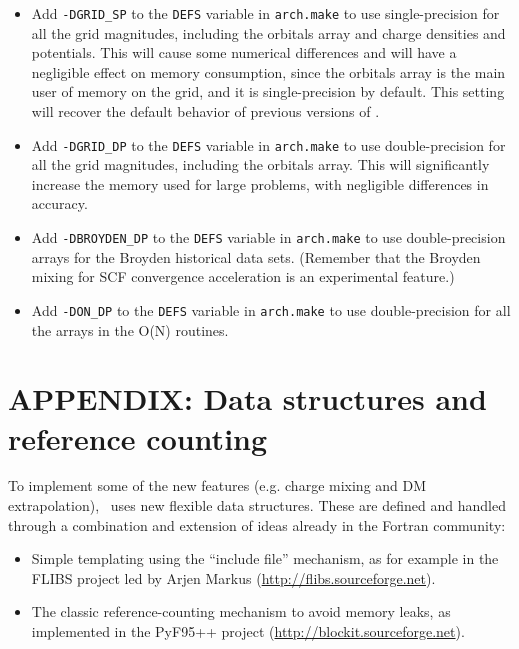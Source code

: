 \begin{itemize}

  \item Add \texttt{-DGRID\_SP} to the \texttt{DEFS} variable in
  \texttt{arch.make} to use single-precision for all the grid
  magnitudes, including the orbitals array and charge densities and
  potentials.  This will cause some numerical differences and will
  have a negligible effect on memory consumption, since the orbitals
  array is the main user of memory on the grid, and it is
  single-precision by default. This setting will recover the default
  behavior of previous versions of \siesta.

  \item Add \texttt{-DGRID\_DP} to the \texttt{DEFS} variable in
  \texttt{arch.make} to use double-precision for all the grid
  magnitudes, including the orbitals array. This will significantly
  increase the memory used for large problems, with negligible
  differences in accuracy.


  \item Add \texttt{-DBROYDEN\_DP} to the \texttt{DEFS} variable in
  \texttt{arch.make} to use double-precision arrays for the Broyden
  historical data sets. (Remember that the Broyden mixing for SCF
  convergence acceleration is an experimental feature.)

  \item Add \texttt{-DON\_DP} to the \texttt{DEFS} variable in
  \texttt{arch.make} to use double-precision for all the arrays in the
  O(N) routines.

\end{itemize}

\newpage
\section{APPENDIX: Data structures and reference counting}

To implement some of the new features (e.g. charge mixing
and DM extrapolation), \siesta\ uses new flexible data structures. These are defined and
handled through a combination and extension of ideas already in the
Fortran community:
\begin{itemize}
\item Simple templating using the ``include file'' mechanism, as for example in
  the FLIBS project led by Arjen Markus
  (\url{http://flibs.sourceforge.net}).
\item The classic reference-counting mechanism to avoid memory leaks, as
  implemented in the PyF95++ project
  (\url{http://blockit.sourceforge.net}).
\end{itemize}

